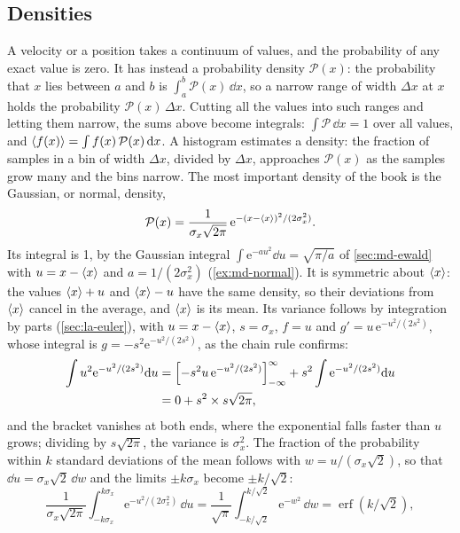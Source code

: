 \subsection*{Densities}

A velocity or a position takes a continuum of values, and the probability
of any exact value is zero. It has instead a probability density
$\mathcal{P}(x)$: the probability that $x$ lies between $a$ and $b$ is
$\int_a^b\mathcal{P}(x)\,\dd x$, so a narrow range of width $\Delta x$ at
$x$ holds the probability $\mathcal{P}(x)\,\Delta x$. Cutting all the
values into such ranges and letting them narrow, the sums above become
integrals: $\int\mathcal{P}\,\dd x = 1$ over all values, and $\langle f(x) \rangle =
\int f(x)\,\mathcal{P}(x)\,\mathrm{d} x$. A histogram estimates a density: the fraction of
samples in a bin of width $\Delta x$, divided by $\Delta x$, approaches
$\mathcal{P}(x)$ as the samples grow many and the bins narrow. The most
important density of the book is the Gaussian, or normal, density,
\begin{equation}
   \mathcal{P}(x) = \frac{1}{\sigma_x\sqrt{2\pi}}\,
   \mathrm{e}^{-(x - \langle x \rangle)^2/(2\sigma_x^2)} .
   \label{eq:sm-gauss}
\end{equation}
Its integral is 1, by the Gaussian integral $\int\mathrm{e}^{-au^2}\dd u =
\sqrt{\pi/a}$ of \cref{sec:md-ewald} with $u = x - \langle x \rangle$ and $a =
1/(2\sigma_x^2)$ (\cref{ex:md-normal}). It is symmetric about $\langle x \rangle$: the values
$\langle x \rangle + u$ and $\langle x \rangle - u$ have the same density, so their deviations
from $\langle x \rangle$ cancel in the average, and $\langle x \rangle$ is its mean. Its variance follows by integration by parts
(\cref{sec:la-euler}), with $u = x - \langle x \rangle$, $s = \sigma_x$, $f = u$
and $g' = u\,\mathrm{e}^{-u^2/(2s^2)}$, whose integral is $g =
-s^2\mathrm{e}^{-u^2/(2s^2)}$, as the chain rule confirms:
\begin{align*}
   \int u^2\mathrm{e}^{-u^2/(2s^2)}\mathrm{d} u
   &= \Bigl[-s^2u\,\mathrm{e}^{-u^2/(2s^2)}\Bigr]_{-\infty}^{\infty}
   + s^2\int\mathrm{e}^{-u^2/(2s^2)}\mathrm{d} u\\
   &= 0 + s^2\times s\sqrt{2\pi} ,
\end{align*}
and the bracket vanishes at both ends, where the exponential falls faster
than $u$ grows; dividing by $s\sqrt{2\pi}$, the variance is $\sigma_x^2$.
The fraction of the probability within $k$ standard deviations of the mean
follows with $w = u/(\sigma_x\sqrt2)$, so that $\dd u = \sigma_x\sqrt2\,\dd
w$ and the limits $\pm k\sigma_x$ become $\pm k/\sqrt2$:
\begin{equation*}
   \frac{1}{\sigma_x\sqrt{2\pi}}\int_{-k\sigma_x}^{k\sigma_x}
   \mathrm{e}^{-u^2/(2\sigma_x^2)}\,\dd u
   = \frac{1}{\sqrt\pi}\int_{-k/\sqrt2}^{k/\sqrt2}\mathrm{e}^{-w^2}\,\dd w
   = \operatorname{erf}(k/\sqrt2) ,
\end{equation*}
